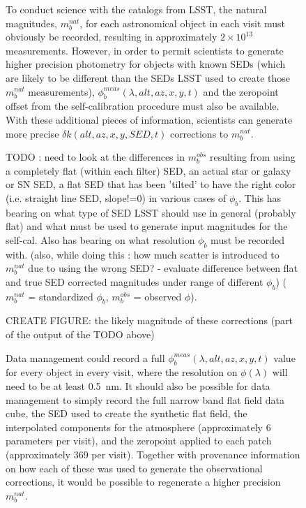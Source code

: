 \documentclass[12pt,preprint]{aastex}
\begin{document}
\begin{figure}[htbp]
{To conduct science with the catalogs from LSST, the natural magnitudes, $m_b^{nat}$, for each astronomical object in
each visit must obviously be recorded, resulting in approximately
$2\times10^{13}$ measurements. However, in order to permit scientists
to generate higher precision photometry for objects with known SEDs
(which are likely to be different than the SEDs LSST used to create
those $m_b^{nat}$ measurements),
$\phi_b^{meas}(\lambda,alt,az,x,y,t)$ and the zeropoint offset from
the self-calibration procedure must also be available. With these
additional pieces of information, scientists can generate more precise
$\delta k(alt,az,x,y,SED,t)$ corrections to $m_b^{nat}$.

TODO : need to look at the differences in $m_b^{obs}$ resulting from
using a completely flat (within each filter) SED, an actual star or
galaxy or SN SED, a flat SED that has been 'tilted' to have the right
color (i.e. straight line SED, slope!=0) in various cases of
$\phi_b$. This has bearing on what type of SED LSST should use in
general (probably flat) and what must be used to generate input
magnitudes for the self-cal. Also has bearing on what resolution
$\phi_b$ must be recorded with.   (also, while doing this : how much
scatter is introduced to $m_b^{nat}$ due to using the wrong SED? -
evaluate difference between flat and true SED corrected magnitudes under range of different
$\phi_b$)  ($m_b^{nat}$ = standardized $\phi_b$, $m_b^{obs}$ =
observed $\phi$). 

CREATE FIGURE: the likely magnitude of these corrections (part of the output
of the TODO above)

Data management could record a full $\phi_b^{meas}(\lambda,alt,az,x,y,t)$ value
for every object in every visit, where the resolution on
$\phi(\lambda)$ will need to be at least 0.5~nm.  It should also be possible
for data management to simply record the full narrow band flat field
data cube, the SED used to create the synthetic flat field, 
the interpolated components for the atmosphere (approximately 6
parameters per visit), and the zeropoint applied to each patch
(approximately 369 per visit). Together with provenance information on
how each of these was used to generate the observational corrections,
it would be possible to regenerate a higher precision $m_b^{nat}$. 




}
\end{figure}
\end{document}
